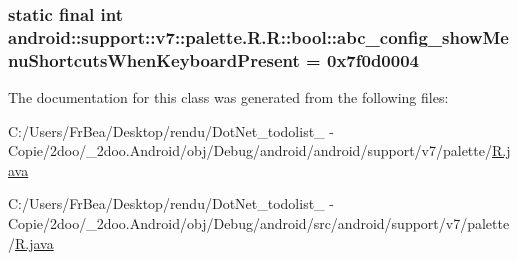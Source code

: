 \hypertarget{classandroid_1_1support_1_1v7_1_1palette_1_1_r_1_1bool_a8b599c2a17a9b76f1a2f4eae69e65f4}{
\subsubsection[{abc\_\-config\_\-showMenuShortcutsWhenKeyboardPresent}]{\setlength{\rightskip}{0pt plus 5cm}static final int android::support::v7::palette.R.R::bool::abc\_\-config\_\-showMenuShortcutsWhenKeyboardPresent = 0x7f0d0004}}
\label{classandroid_1_1support_1_1v7_1_1palette_1_1_r_1_1bool_a8b599c2a17a9b76f1a2f4eae69e65f4}




The documentation for this class was generated from the following files:\begin{CompactItemize}
\item 
C:/Users/FrBea/Desktop/rendu/DotNet\_\-todolist\_ - Copie/2doo/\_\-2doo.Android/obj/Debug/android/android/support/v7/palette/\hyperlink{android_2support_2v7_2palette_2_r_8java}{R.java}\item 
C:/Users/FrBea/Desktop/rendu/DotNet\_\-todolist\_ - Copie/2doo/\_\-2doo.Android/obj/Debug/android/src/android/support/v7/palette/\hyperlink{src_2android_2support_2v7_2palette_2_r_8java}{R.java}\end{CompactItemize}
